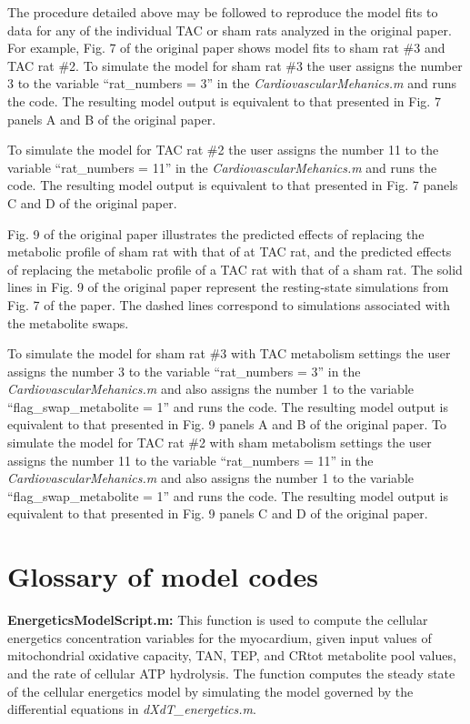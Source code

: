 \documentclass[fleqn,10pt]{physiome}
\begin{document}
The procedure detailed above may be followed to reproduce the model fits to data for any of the individual TAC or sham rats analyzed in the original paper. For example, Fig. 7 of the original paper shows model fits to sham rat \#3 and TAC rat \#2. To simulate the model for sham rat \#3 the user assigns the number 3 to the variable ``rat\_numbers = 3'' in the {\em CardiovascularMehanics.m} and runs the code. The resulting model output is equivalent to that presented in Fig. 7 panels A and B of the original paper.

To simulate the model for TAC rat \#2 the user assigns the number 11 to the variable ``rat\_numbers = 11'' in the {\em CardiovascularMehanics.m} and runs the code. The resulting model output is equivalent to that presented in Fig. 7 panels C and D of the original paper.

Fig. 9 of the original paper illustrates the predicted effects of replacing
the metabolic profile of sham rat with that of at TAC rat, and the predicted effects of replacing the metabolic profile of a TAC rat with that of a sham rat. The solid lines in Fig. 9 of the original paper represent the resting-state simulations from Fig. 7 of the paper. The dashed lines correspond to simulations associated with the metabolite swaps. 

To simulate the model for sham rat \#3 with TAC metabolism settings the user assigns the number 3 to the variable ``rat\_numbers = 3'' in the {\em CardiovascularMehanics.m} and also assigns the number 1 to the variable ``flag\_swap\_metabolite = 1'' and runs the code. The resulting model output is equivalent to that presented in Fig. 9 panels A and B of the original paper. To simulate the model for TAC rat \#2 with sham metabolism settings the user assigns the number 11 to the variable ``rat\_numbers = 11'' in the {\em CardiovascularMehanics.m} and also assigns the number 1 to the variable ``flag\_swap\_metabolite = 1'' and runs the code. The resulting model output is equivalent to that presented in Fig. 9 panels C and D of the original paper.

\section{Glossary of model codes}

\textbf{EnergeticsModelScript.m:} This function is used to compute the cellular energetics concentration variables for the myocardium, given input values of mitochondrial oxidative capacity, TAN, TEP, and CRtot metabolite pool values, and the rate of cellular ATP hydrolysis. The function computes the steady state of the cellular energetics model by simulating the model governed by the differential equations in {\em dXdT\_energetics.m}.
\end{document}
